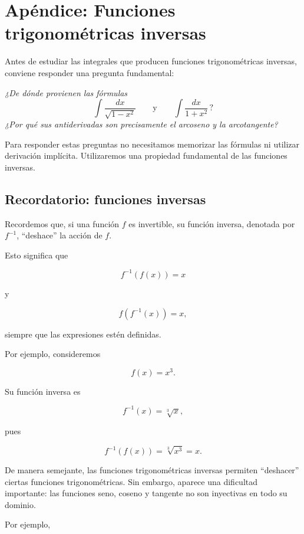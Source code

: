 \documentclass[12pt]{article}
\theoremstyle{definition}
\theoremstyle{remark}
\begin{document}
\section{Ap\'endice: Funciones trigonom\'etricas inversas}

Antes de estudiar las integrales que producen funciones trigonométricas
inversas, conviene responder una pregunta fundamental:

\begin{center}
\emph{¿De dónde provienen las fórmulas}
\[
\int \frac{dx}{\sqrt{1-x^2}}
\qquad\text{y}\qquad
\int \frac{dx}{1+x^2}\,?
\]
\emph{¿Por qué sus antiderivadas son precisamente el arcoseno y la
arcotangente?}
\end{center}

Para responder estas preguntas no necesitamos memorizar las fórmulas ni
utilizar derivación implícita. Utilizaremos una propiedad fundamental de
las funciones inversas.

\subsection{Recordatorio: funciones inversas}

Recordemos que, si una función $f$ es invertible, su función inversa,
denotada por $f^{-1}$, ``deshace'' la acción de $f$.

Esto significa que

\[
f^{-1}(f(x))=x
\]

y

\[
f(f^{-1}(x))=x,
\]

siempre que las expresiones estén definidas.

Por ejemplo, consideremos

\[
f(x)=x^3.
\]

Su función inversa es

\[
f^{-1}(x)=\sqrt[3]{x},
\]

pues

\[
f^{-1}(f(x))
=
\sqrt[3]{x^3}
=
x.
\]

De manera semejante, las funciones trigonométricas inversas permiten
``deshacer'' ciertas funciones trigonométricas. Sin embargo, aparece una
dificultad importante: las funciones seno, coseno y tangente no son
inyectivas en todo su dominio.

Por ejemplo,
\end{document}
